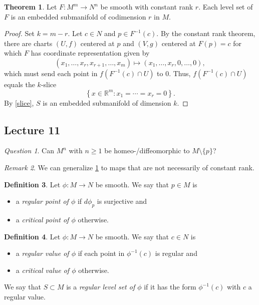 \documentclass[10pt,letterpaper,cm]{nupset}
\theoremstyle{definition}
\newtheorem{definition}{Definition}[subsection]
\theoremstyle{theorem}
\newtheorem{theorem}[definition]{Theorem}
\theoremstyle{remark}
\newtheorem{remark}[definition]{Remark}
\newtheorem*{question}{Question}
\newcommand{\R}{\mathbb R}
\newcommand{\1}{\mathbf{1}}
\newcommand{\0}{\vec 0}
\begin{document}
\begin{theorem}\label{lset}
Let $F: M^m \to N^n$ be smooth with constant rank $r$. Each level set of $F$ is an embedded submanifold of codimension $r$ in $M$.
\end{theorem}
\begin{proof}
Set $k = m -r$. Let $c \in N$ and $p \in F^{-1}(c)$. By the constant rank theorem, there are charts $(U, f)$ centered at $p$ and $(V, g)$ centered at $F(p) = c$ for which $F$ has coordinate representation given by $$\left(x_1, \ldots, x_r, x_{r+1}, \ldots, x_m\right) \mapsto \left(x_1, \ldots, x_r, 0, \ldots, 0\right),$$ which must send each point in $f(F^{-1}(c) \cap U)$ to $0$.  Thus, $f(F^{-1}(c) \cap U)$ equals the $k$-slice $$\left\{x \in \R^m : x_1 = \cdots = x_r = 0\right\}.$$ By \cref{slice}, $S$ is an embedded submanifold of dimension $k$.
\end{proof}

\subsection{Lecture 11}

\begin{question}
Can $M^n$ with $n\geq 1$ be homeo-/diffeomorphic to $M\setminus \{p\}$? 
\end{question}

\medskip

\begin{remark}
We can generalize \cref{lset} to maps that are not necessarily of constant rank.
\end{remark}

\begin{definition}
Let $\phi : M \to N$ be smooth. We say that $p\in M$ is
\begin{itemize}
\item a \textit{regular point of $\phi$} if $d\phi_p$ is surjective and
\item a \textit{critical point of $\phi$} otherwise.
\end{itemize}
\end{definition}

\begin{definition}
Let $\phi : M \to N$ be smooth.  We say that $c \in N$ is
\begin{itemize}
\item  a \textit{regular value of $\phi$} if each point in $\phi^{-1}(c)$ is regular and
\item a \textit{critical value of $\phi$} otherwise.
\end{itemize}
We say that $S \subset M$ is a \textit{regular level set of $\phi$} if it has the form $\phi^{-1}(c)$ with $c$ a regular value.
\end{definition}
\end{document}

